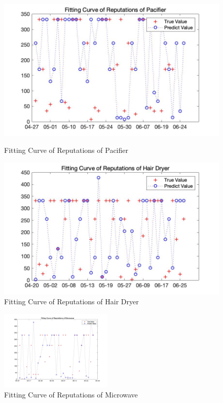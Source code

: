 \documentclass{mcmthesis}
\begin{document}
\begin{figure}[H]
\begin{minipage}[t]{0.48\linewidth}	
\centering
\includegraphics[width=1.0\textwidth]{figures/curve_pacifier.jpg}
\caption{Fitting Curve of Reputations of Pacifier}	  
\end{minipage}
\hfill
\begin{minipage}[t]{0.48\linewidth}	
\centering
\includegraphics[width=1.0\textwidth]{figures/curve_hair.jpg}
\caption{Fitting Curve of Reputations of Hair Dryer}	  
\end{minipage}
\end{figure}
\begin{figure}[H]
\centering
\includegraphics[width=0.48\textwidth]{figures/curve_wave.jpg}
\caption{Fitting Curve of Reputations of Microwave}	  
\end{figure}
\end{document}
